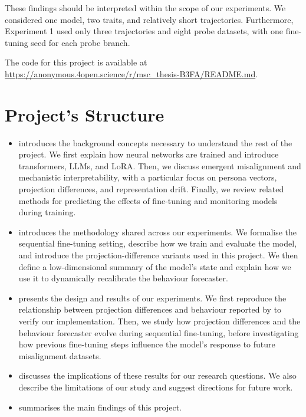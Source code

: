 These findings should be interpreted within the scope of our experiments. We considered one model, two traits, and relatively short trajectories. Furthermore, Experiment 1 used only three trajectories and eight probe datasets, with one fine-tuning seed for each probe branch.

The code for this project is available at \url{https://anonymous.4open.science/r/msc_thesis-B3FA/README.md}.

\section{Project's Structure}
\begin{itemize}
    \item {} introduces the background concepts necessary to understand the rest of the project. We first explain how neural networks are trained and introduce transformers, LLMs, and LoRA. Then, we discuss emergent misalignment and mechanistic interpretability, with a particular focus on persona vectors, projection differences, and representation drift. Finally, we review related methods for predicting the effects of fine-tuning and monitoring models during training.
    \item {} introduces the methodology shared across our experiments. We formalise the sequential fine-tuning setting, describe how we train and evaluate the model, and introduce the projection-difference variants used in this project. We then define a low-dimensional summary of the model's state and explain how we use it to dynamically recalibrate the behaviour forecaster.
    \item {} presents the design and results of our experiments. We first reproduce the relationship between projection differences and behaviour reported by \citet{chen2025persona_vectors} to verify our implementation. Then, we study how projection differences and the behaviour forecaster evolve during sequential fine-tuning, before investigating how previous fine-tuning steps influence the model's response to future misalignment datasets.
    \item {} discusses the implications of these results for our research questions. We also describe the limitations of our study and suggest directions for future work.
    \item {} summarises the main findings of this project.
\end{itemize}
